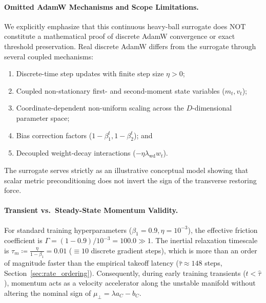 \documentclass{article}
\theoremstyle{plain}
\theoremstyle{definition}
\begin{document}
\paragraph{Omitted AdamW Mechanisms and Scope Limitations.}
We explicitly emphasize that this continuous heavy-ball surrogate does NOT constitute a mathematical proof of discrete AdamW convergence or exact threshold preservation. Real discrete AdamW differs from the surrogate through several coupled mechanisms:
\begin{enumerate}[leftmargin=*,noitemsep]
    \item Discrete-time step updates with finite step size $\eta > 0$;
    \item Coupled non-stationary first- and second-moment state variables ($m_t, v_t$);
    \item Coordinate-dependent non-uniform scaling across the $D$-dimensional parameter space;
    \item Bias correction factors ($1 - \beta_1^t, 1 - \beta_2^t$); and
    \item Decoupled weight-decay interactions ($-\eta \lambda_{\text{wd}} w_t$).
\end{enumerate}
The surrogate serves strictly as an illustrative conceptual model showing that scalar metric preconditioning does not invert the sign of the transverse restoring force.

\paragraph{Transient vs.\ Steady-State Momentum Validity.}
For standard training hyperparameters ($\beta_1 = 0.9, \eta = 10^{-3}$), the effective friction coefficient is $\Gamma = (1 - 0.9)/10^{-3} = 100.0 \gg 1$. The inertial relaxation timescale is $\tau_m \coloneqq \frac{\eta}{1 - \beta_1} = 0.01$ ($\equiv 10$ discrete gradient steps), which is more than an order of magnitude faster than the empirical takeoff latency ($\hat{\tau} \approx 148$ steps, Section~\ref{sec:rate_ordering}). Consequently, during early training transients ($t < \hat{\tau}$), momentum acts as a velocity accelerator along the unstable manifold without altering the nominal sign of $\mu_{\perp} = \lambda a_C - b_C$.
\end{document}

